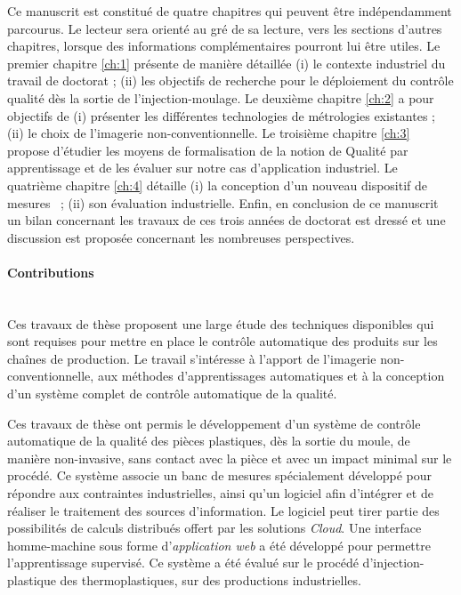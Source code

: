 Ce manuscrit est constitué de quatre chapitres qui peuvent être indépendamment parcourus.
Le lecteur sera orienté au gré de sa lecture, vers les sections d'autres chapitres, lorsque des informations complémentaires pourront lui être utiles.
Le premier chapitre \ref{ch:1} présente de manière détaillée (i) le contexte industriel du travail de doctorat ; (ii) les objectifs de recherche pour le déploiement du contrôle qualité dès la sortie de l'injection-moulage.
Le deuxième chapitre \ref{ch:2} a pour objectifs de (i) présenter les différentes technologies de métrologies existantes ; (ii) le choix de l'imagerie non-conventionnelle.
Le troisième chapitre \ref{ch:3} propose d'étudier les moyens de formalisation de la notion de Qualité par apprentissage et de les évaluer sur notre cas d'application industriel.
Le quatrième chapitre \ref{ch:4} détaille (i) la conception d'un nouveau dispositif de mesures \ ; (ii) son évaluation industrielle.
Enfin, en conclusion de ce manuscrit un bilan concernant les travaux de ces trois années de doctorat est dressé et une discussion est proposée concernant les nombreuses perspectives.

\bigskip
\paragraph{Contributions}\mbox{} \\

Ces travaux de thèse proposent une large étude des techniques disponibles qui sont requises pour mettre en place le contrôle automatique des produits sur les chaînes de production.
Le travail s'intéresse à l'apport de l'imagerie non-conventionnelle, aux méthodes d'apprentissages automatiques et à la conception d'un système complet de contrôle automatique de la qualité.

Ces travaux de thèse ont permis le développement d'un système de contrôle automatique de la qualité des pièces plastiques, dès la sortie du moule, de manière non-invasive, sans contact avec la pièce et avec un impact minimal sur le procédé.
Ce système associe un banc de mesures spécialement développé pour répondre aux contraintes industrielles, ainsi qu'un logiciel afin d'intégrer et de réaliser le traitement des sources d'information.
Le logiciel peut tirer partie des possibilités de calculs distribués offert par les solutions \textit{Cloud}.
Une interface homme-machine sous forme d'\textit{application web} a été développé pour permettre l'apprentissage supervisé.
Ce système a été évalué sur le procédé d'injection-plastique des thermoplastiques, sur des productions industrielles.

